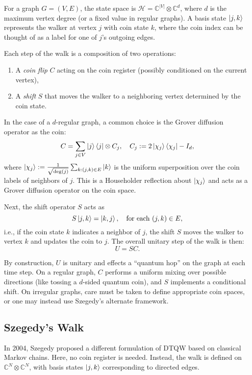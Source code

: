 \documentclass[12pt]{report}
\begin{document}
For a graph $G=(V,E)$, the state space is $\mathcal{H} = \mathbb{C}^{|V|} \otimes \mathbb{C}^d$, where $d$ is the maximum vertex degree (or a fixed value in regular graphs). A basis state $\ket{j,k}$ represents the walker at vertex $j$ with coin state $k$, where the coin index can be thought of as a label for one of $j$'s outgoing edges.

Each step of the walk is a composition of two operations:
\begin{enumerate}
    \item A \emph{coin flip} $C$ acting on the coin register (possibly conditioned on the current vertex),
    \item A \emph{shift} $S$ that moves the walker to a neighboring vertex determined by the coin state.
\end{enumerate}

In the case of a $d$-regular graph, a common choice is the Grover diffusion operator as the coin:
\[
C = \sum_{j \in V} \ket{j}\bra{j} \otimes C_j, \quad C_j := 2 \ket{\chi_j}\bra{\chi_j} - I_d,
\]
where $\ket{\chi_j} := \frac{1}{\sqrt{\deg(j)}} \sum_{k : (j,k) \in E} \ket{k}$ is the uniform superposition over the coin labels of neighbors of $j$. This is a Householder reflection about $\ket{\chi_j}$ and acts as a Grover diffusion operator on the coin space.

Next, the shift operator $S$ acts as
\[
S \ket{j,k} = \ket{k,j}, \quad \text{for each } (j,k) \in E,
\]
i.e., if the coin state $k$ indicates a neighbor of $j$, the shift $S$ moves the walker to vertex $k$ and updates the coin to $j$. The overall unitary step of the walk is then:
\[
U = S C.
\]

By construction, $U$ is unitary and effects a “quantum hop” on the graph at each time step. On a regular graph, $C$ performs a uniform mixing over possible directions (like tossing a $d$-sided quantum coin), and $S$ implements a conditional shift. On irregular graphs, care must be taken to define appropriate coin spaces, or one may instead use Szegedy’s alternate framework.

\subsection{Szegedy’s Walk}

In 2004, Szegedy proposed a different formulation of DTQW based on classical Markov chains. Here, no coin register is needed. Instead, the walk is defined on $\mathbb{C}^N \otimes \mathbb{C}^N$, with basis states $\ket{j,k}$ corresponding to directed edges.
\end{document}
